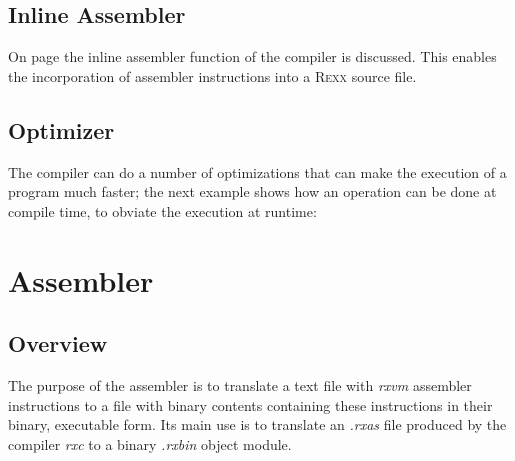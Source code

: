  \section{Inline Assembler}
 On page \pageref{inlineAssembly} the inline assembler function of
 the \crexx{} compiler is discussed. This enables the incorporation
 of  assembler instructions into a \textsc{Rexx} source
 file.

\section{Optimizer}\label{fpowexample}
 The compiler can do a number of optimizations that can make the
 execution of a program much faster; the next example shows how an
 operation can be done at compile time, to obviate the execution at
 runtime:

\begin{shaded}
  \small
\obeylines {}
\end{shaded}

 
\chapter{\crexx{} Assembler}
\section{Overview}
The purpose of the \crexx{} assembler  is to translate a text file with
\emph{rxvm} assembler instructions to a file with binary contents containing these
instructions in their binary, executable form. Its main use is to
translate an \emph{.rxas} file produced by the \crexx{} compiler
\emph{rxc} to a binary \emph{.rxbin} object module.

